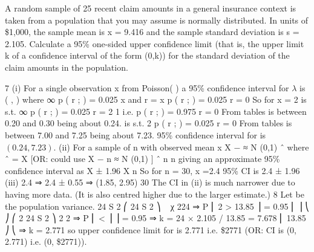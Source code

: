 \documentclass[a4paper,12pt]{article}
\begin{document}
\item 
A random sample of 25 recent claim amounts in a general insurance context is taken from a population that you may assume is normally distributed. In units of \$1,000, the sample mean is x = 9.416 and the sample standard deviation is s = 2.105.
Calculate a 95\% one-sided upper confidence limit (that is, the upper limit k of a confidence interval of the form (0,k)) for the standard deviation of the claim amounts in the population.

7
(i)
For a single observation x from Poisson( \lambda ) a 95\% confidence interval for $\lambda$ is
(  ,  ) where
∞
\sum p ( r ;  ) = 0.025
x
and
r = x
\sum p ( r ;  ) = 0.025
r = 0
So for x = 2
 is s.t.
∞
\sum p ( r ;  ) = 0.025
r = 2
1
i.e.
\sum p ( r ;  ) = 0.975
r = 0
From tables  is between 0.20 and 0.30 being about 0.24.
 is s.t.
2
\sum p ( r ;  ) = 0.025
r = 0
From tables  is between 7.00 and 7.25 being about 7.23.
95\% confidence interval for \lambda is $(0.24, 7.23)$.
(ii)
For a sample of n with observed mean x
X −\lambda
≈ N (0,1)
ˆ \lambda
where \lambda ˆ = X
[OR: could use
\sum  X − n \lambda
≈ N (0,1) ]
ˆ
n \lambda
n
giving an approximate 95\% confidence interval as X ± 1.96
X
n
So for n = 30, x =2.4
95\% CI is 2.4 ± 1.96
(iii)
2.4
⇒ 2.4 ± 0.55 ⇒ (1.85, 2.95)
30
The CI in (ii) is much narrower due to having more data.
(It is also centred higher due to the larger estimate.)
8
Let  be the population variance.
24 S 2
⎛ 24 S 2
⎞
~ χ 224 ⇒ P ⎜ 2 > 13.85 ⎟ = 0.95
⎜ \sum 
⎟
⎝
⎠
⎛ 2 24 S 2 ⎞
2
2
⇒ P ⎜ \sum  <
⎟ ⎟ = 0.95 ⇒ k = 24 × 2.105 / 13.85 = 7.678
⎜
13.85 ⎠
⎝
⇒ k = 2.771 so upper confidence limit for \sum  is 2.771 i.e. \$2771
(OR: CI is (0, 2.771) i.e. (0, \$2771)).
\end{document}
